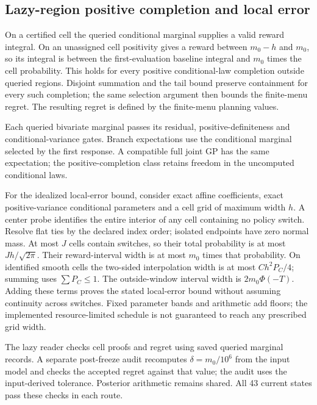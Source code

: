 \subsection{Lazy-region positive completion and local error}

On a certified cell the queried conditional marginal supplies a valid reward integral. On an unassigned cell positivity gives a reward between $m_0-h$ and $m_0$, so its integral is between the first-evaluation baseline integral and $m_0$ times the cell probability. This holds for every positive conditional-law completion outside queried regions. Disjoint summation and the tail bound preserve containment for every such completion; the same selection argument then bounds the finite-menu regret. The resulting regret is defined by the finite-menu planning values.

Each queried bivariate marginal passes its residual, positive-definiteness and conditional-variance gates. Branch expectations use the conditional marginal selected by the first response. A compatible full joint GP has the same expectation; the positive-completion class retains freedom in the uncomputed conditional laws.

For the idealized local-error bound, consider exact affine coefficients, exact positive-variance conditional parameters and a cell grid of maximum width $h$. A center probe identifies the entire interior of any cell containing no policy switch. Resolve flat ties by the declared index order; isolated endpoints have zero normal mass. At most $J$ cells contain switches, so their total probability is at most $Jh/\sqrt{2\pi}$. Their reward-interval width is at most $m_0$ times that probability. On identified smooth cells the two-sided interpolation width is at most $C h^2 P_C/4$; summing uses $\sum P_C\le1$. The outside-window interval width is $2m_0\Phi(-T)$. Adding these terms proves the stated local-error bound without assuming continuity across switches. Fixed parameter bands and arithmetic add floors; the implemented resource-limited schedule is not guaranteed to reach any prescribed grid width.

The lazy reader checks cell proofs and regret using saved queried marginal records. A separate post-freeze audit recomputes $\delta=m_0/10^6$ from the input model and checks the accepted regret against that value; the audit uses the input-derived tolerance. Posterior arithmetic remains shared. All 43 current states pass these checks in each route.
